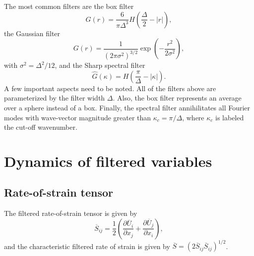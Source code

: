 \documentclass[oneside,a4paper,11pt]{report}
\newcommand{\ures}{\overline{U}}
\begin{document}
The most common filters are the box filter 
\begin{equation}
G( r ) = \frac{6 }{\pi  \Delta^3} H ( \frac{\Delta}{2} - | r | ),
\end{equation}
the Gaussian filter
\begin{equation}
G( r ) = \frac{ 1 }{ ( 2 \pi \sigma^2 )^{3/2} } \exp \left( -\frac{ r^2 }{ 2 \sigma^2  } \right ),
\end{equation}
with $\sigma^2 = \Delta^2/12$, and the Sharp spectral filter
\begin{equation}
\hat{G}( \kappa ) = H( \frac{ \pi }{ \Delta } - | \kappa | ).
\end{equation}
A few important aspects need to be noted. All of the filters above are parameterized by the filter width $\Delta$. Also, the box filter represents an average over a sphere instead of a box. Finally, the spectral filter annihilitates all Fourier modes with wave-vector magnitude greater than $\kappa_c = \pi / \Delta$, where $\kappa_c$ is labeled the cut-off wavenumber.


\section{Dynamics of filtered variables}


\subsection{Rate-of-strain tensor}
The filtered rate-of-strain tensor is given by
\begin{equation}
\overline{S}_{ij} = \frac{1}{2} \left ( \frac{\partial \ures_i}{\partial x_j} + \frac{\partial \ures_j}{\partial x_i} \right ),
\end{equation}
and the characteristic filtered rate of strain is given by $\overline{S} = \left ( 2 \overline{S}_{ij} \overline{S}_{ij} \right ) ^{1/2}$. 
\end{document}
